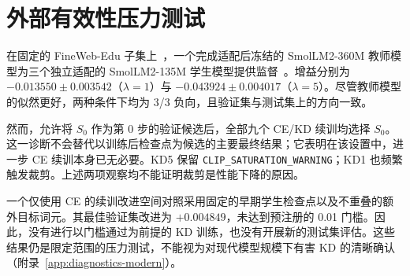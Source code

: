 \section{外部有效性压力测试}\label{sec:external-validity}

在固定的 FineWeb-Edu 子集上~\citep{penedo2024fineweb}，一个完成适配后冻结的 SmolLM2-360M 教师模型为三个独立适配的 SmolLM2-135M 学生模型提供监督~\citep{benallal2025smollm2}。增益分别为 $-0.013550\pm0.003542$（$\lambda=1$）与 $-0.043924\pm0.004017$（$\lambda=5$）。尽管教师模型的似然更好，两种条件下均为 3/3 负向，且验证集与测试集上的方向一致。

然而，允许将 $S_0$ 作为第 0 步的验证候选后，全部九个 CE/KD 续训均选择 $S_0$。这一诊断不会替代以训练后检查点为候选的主要最终结果；它表明在该设置中，进一步 CE 续训本身已无必要。KD5 保留 \texttt{CLIP\_SATURATION\_WARNING}；KD1 也频繁触发裁剪。上述两项观察均不能证明裁剪是性能下降的原因。

一个仅使用 CE 的续训改进空间对照采用固定的早期学生检查点以及不重叠的额外目标词元。其最佳验证集改进为 $+0.004849$，未达到预注册的 0.01 门槛。因此，没有进行以门槛通过为前提的 KD 训练，也没有开展新的测试集评估。这些结果仍是限定范围的压力测试，不能视为对现代模型规模下有害 KD 的清晰确认（附录~\ref{app:diagnostics-modern}）。
